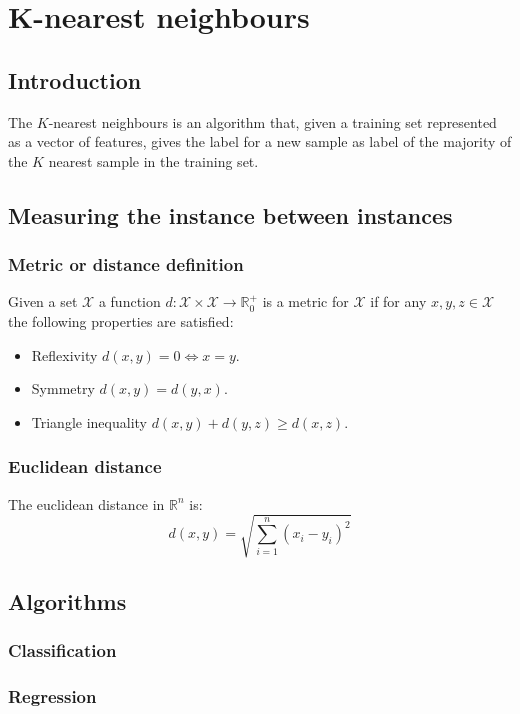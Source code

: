 \chapter{K-nearest neighbours}

\section{Introduction}
The $K$-nearest neighbours is an algorithm that, given a training set represented as a vector of features, gives the label for a new sample as label of the majority of the $K$ nearest sample in the training set.

\section{Measuring the instance between instances}

	\subsection{Metric or distance definition}
	Given a set $\mathcal{X}$ a function $d:\mathcal{X}\times\mathcal{X}\rightarrow\mathbb{R}^+_0$ is a metric for $\mathcal{X}$ if for any $x,y,z\in \mathcal{X}$ the following properties are satisfied:
	\begin{itemize}
		\item Reflexivity $d(x,y) = 0 \Leftrightarrow x = y$.
		\item Symmetry $d(x,y) = d(y,x)$.
		\item Triangle inequality $d(x, y) + d(y, z) \ge d(x, z)$.
	\end{itemize}

	\subsection{Euclidean distance}
	The euclidean distance in $\mathbb{R}^n$ is:
	$$d(x,y) = \sqrt{\sum\limits_{i=1}^n(x_i-y_i)^2}$$

\section{Algorithms}

	\subsection{Classification}

	\subsection{Regression}

